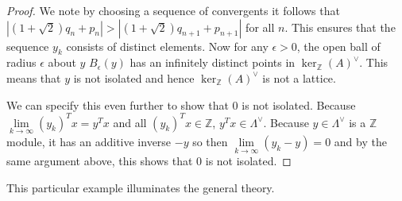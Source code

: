 \documentclass{article}
\newcommand{\Z}[0]{\mathbb{Z}}		%
\newcommand{\R}[0]{\mathbb{R}}		%
\newtheorem{conj}[thm]{Conjecture}
\theoremstyle{definition}
\theoremstyle{remark}
\begin{document}
\begin{proof}
We note by choosing a sequence of convergents it follows that $|(1+\sqrt{2})q_n +p_n|>|(1+\sqrt{2})q_{n+1} +p_{n+1}|$ for all $n$. This ensures that the sequence $y_k$ consists of distinct elements. Now for any $\epsilon>0$, the open ball of radius $\epsilon$ about $y$ $B_\epsilon(y)$ has an infinitely distinct points in $\ker_\Z(A)^\vee$. This means that $y$ is not isolated and hence $\ker_\Z(A)^\vee$ is not a lattice. 

We can specify this even further to show that $0$ is not isolated. Because $\lim\limits_{k\to \infty} (y_k)^T x= y^Tx$ and all $(y_k)^T x  \in \Z$, $y^Tx\in \Lambda^\vee$. Because $y\in \Lambda^\vee$ is a $\Z$ module, it has an additive inverse $-y$ so then $\lim\limits_{k\to \infty}(y_k-y)= 0$ and by the same argument above, this shows that $0$ is not isolated. 

\end{proof}
This particular example illuminates the general theory. 
\end{document}
